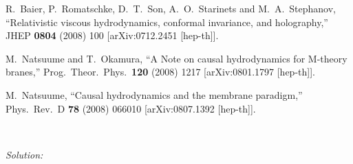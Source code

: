 \begin{thebibliography}{99}
  R.~Baier, P.~Romatschke, D.~T.~Son, A.~O.~Starinets and M.~A.~Stephanov,
  ``Relativistic viscous hydrodynamics, conformal invariance, and holography,''
  JHEP {\bf 0804} (2008) 100
  [arXiv:0712.2451 [hep-th]].

  M.~Natsuume and T.~Okamura,
  ``A Note on causal hydrodynamics for M-theory branes,''
  Prog.\ Theor.\ Phys.\  {\bf 120} (2008) 1217
  [arXiv:0801.1797 [hep-th]].

  M.~Natsuume,
  ``Causal hydrodynamics and the membrane paradigm,''
  Phys.\ Rev.\ D {\bf 78} (2008) 066010
  [arXiv:0807.1392 [hep-th]].
  
\end{thebibliography}

\endofsection

\begin{prob}
\textbf{}\\
\end{prob}

{\color{blue} 
\textit{Solution:}
}
